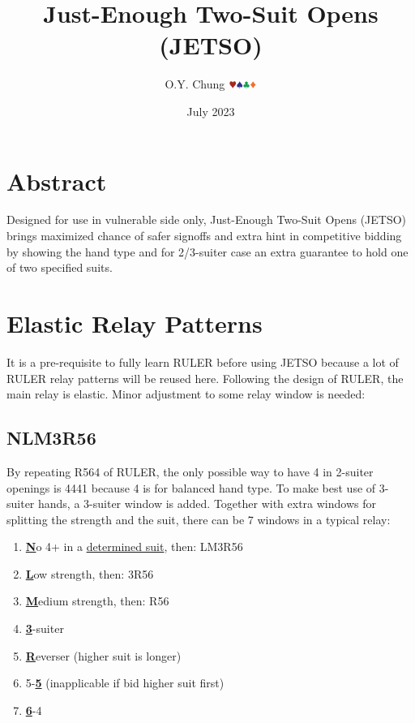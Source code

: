 \documentclass{article}
\title{Just-Enough Two-Suit Opens (JETSO)}
\author{O.Y. Chung $\hhh\sss\ccc\ddd$}
\date{July 2023}
\begin{document}
\maketitle
\begin{multicols}{2}
\begin{CJK*}{UTF8}{gt}

\section{Abstract}
Designed for use in vulnerable side only, Just-Enough Two-Suit Opens (JETSO) brings maximized chance of safer signoffs and extra hint in competitive bidding by showing the hand type and for 2/3-suiter case an extra guarantee to hold one of two specified suits.

\section{Elastic Relay Patterns}
It is a pre-requisite to fully learn RULER before using JETSO because a lot of RULER relay patterns will be reused here.  Following the design of RULER, the main relay is elastic. Minor adjustment to some relay window is needed:
\subsection{NLM3R56}\label{sec:nlm3r56}
By repeating R564 of RULER, the only possible way to have 4 in 2-suiter openings is 4441 because 4 is for balanced hand type. To make best use of 3-suiter hands, a 3-suiter window is added. Together with extra windows for splitting the strength and the suit, there can be 7 windows in a typical relay:
\begin{enumerate}
    \item \textbf{\underline{N}}o 4+ in a \hyperref[sec:determine-n-suit]{determined suit}, then: LM3R56
    \item \textbf{\underline{L}}ow strength, then: 3R56
    \item \textbf{\underline{M}}edium strength, then: R56
    \item \textbf{\underline{3}}-suiter
    \item \textbf{\underline{R}}everser (higher suit is longer)
    \item 5-\textbf{\underline{5}} (inapplicable if bid higher suit first)
    \item \textbf{\underline{6}}-4
\end{enumerate}


\end{CJK*}
\end{multicols}
\end{document}
